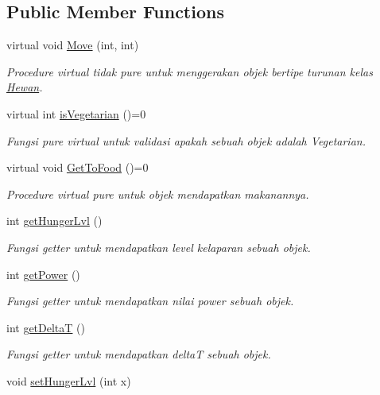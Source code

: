 \subsection*{Public Member Functions}
\begin{DoxyCompactItemize}
\item 
virtual void \hyperlink{class_hewan_aea0228b7a5fc5b15691affeff5ae3099}{Move} (int, int)
\begin{DoxyCompactList}\small\item\em Procedure virtual tidak pure untuk menggerakan objek bertipe turunan kelas \hyperlink{class_hewan}{Hewan}. \end{DoxyCompactList}\item 
virtual int \hyperlink{class_hewan_a90a316426af1d53add7ebf2a23ea9af2}{is\+Vegetarian} ()=0
\begin{DoxyCompactList}\small\item\em Fungsi pure virtual untuk validasi apakah sebuah objek adalah Vegetarian. \end{DoxyCompactList}\item 
virtual void \hyperlink{class_hewan_ab0478d48070dc3c51cda481f678ae40a}{Get\+To\+Food} ()=0
\begin{DoxyCompactList}\small\item\em Procedure virtual pure untuk objek mendapatkan makanannya. \end{DoxyCompactList}\item 
int \hyperlink{class_hewan_a09445ef7de5b3e43b5205ae0857581d5}{get\+Hunger\+Lvl} ()
\begin{DoxyCompactList}\small\item\em Fungsi getter untuk mendapatkan level kelaparan sebuah objek. \end{DoxyCompactList}\item 
int \hyperlink{class_hewan_ab7586f90668c11c1abaf64017f1e557d}{get\+Power} ()
\begin{DoxyCompactList}\small\item\em Fungsi getter untuk mendapatkan nilai power sebuah objek. \end{DoxyCompactList}\item 
int \hyperlink{class_hewan_a9b3d754b6faf3706aabe8dcaec6f1540}{get\+DeltaT} ()
\begin{DoxyCompactList}\small\item\em Fungsi getter untuk mendapatkan deltaT sebuah objek. \end{DoxyCompactList}\item 
void \hyperlink{class_hewan_a07b8d783d4712158dbcad234a1178e81}{set\+Hunger\+Lvl} (int x)

\end{DoxyCompactItemize}
